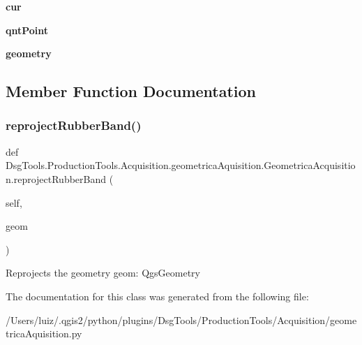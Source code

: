 \begin{DoxyCompactItemize}
{\bfseries cur}
\item 
\mbox{\label{class_dsg_tools_1_1_production_tools_1_1_acquisition_1_1geometrica_aquisition_1_1_geometrica_acquisition_af6c881cfc18397d3bec94001527aa99d}} 
{\bfseries qnt\+Point}
\item 
\mbox{\label{class_dsg_tools_1_1_production_tools_1_1_acquisition_1_1geometrica_aquisition_1_1_geometrica_acquisition_af378f722088bd056dd66dfbbbadec3d1}} 
{\bfseries geometry}
\end{DoxyCompactItemize}


\subsection{Member Function Documentation}
\mbox{\label{class_dsg_tools_1_1_production_tools_1_1_acquisition_1_1geometrica_aquisition_1_1_geometrica_acquisition_a364669314bbb8f6b07d9c77189efd4ec}} 
\subsubsection{\texorpdfstring{reproject\+Rubber\+Band()}{reprojectRubberBand()}}
{\footnotesize\ttfamily def Dsg\+Tools.\+Production\+Tools.\+Acquisition.\+geometrica\+Aquisition.\+Geometrica\+Acquisition.\+reproject\+Rubber\+Band (\begin{DoxyParamCaption}\item[{}]{self,  }\item[{}]{geom }\end{DoxyParamCaption})}

\begin{DoxyVerb}Reprojects the geometry
geom: QgsGeometry
\end{DoxyVerb}
 

The documentation for this class was generated from the following file\+:\begin{DoxyCompactItemize}
\item 
/\+Users/luiz/.\+qgis2/python/plugins/\+Dsg\+Tools/\+Production\+Tools/\+Acquisition/geometrica\+Aquisition.\+py\end{DoxyCompactItemize}

